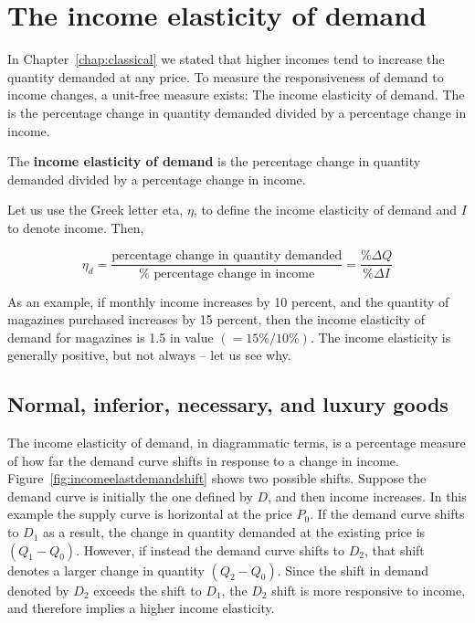 \section{The income elasticity of demand}\label{sec:ch4sec5}

In Chapter~\ref{chap:classical} we stated that higher incomes tend to
increase the quantity demanded at any price. To measure the responsiveness
of demand to income changes, a unit-free measure exists: The income
elasticity of demand. The  is the
percentage change in quantity demanded divided by a percentage change in
income.

\begin{DefBox}
The \textbf{income elasticity of demand} is the percentage change in quantity demanded divided by a percentage change in income.
\end{DefBox}

Let us use the Greek letter eta, $\eta$, to define the income elasticity of
demand and $I$ to denote income. Then,

\begin{equation*}
\eta_{d}=\frac{\text{percentage change in quantity demanded}}{\text{%
percentage change in income}}=\frac{\%\Delta Q}{\%\Delta I} 
\end{equation*}

As an example, if monthly income increases by 10 percent, and the quantity
of magazines purchased increases by 15 percent, then the income elasticity
of demand for magazines is 1.5 in value $(=15\%/10\%)$. The income
elasticity is generally positive, but not always -- let us see why.

\newhtmlpage

\subsection*{Normal, inferior, necessary, and luxury goods}

The income elasticity of demand, in diagrammatic terms, is a percentage
measure of how far the demand curve shifts in response to a change in
income. Figure~\ref{fig:incomeelastdemandshift} shows two possible shifts.
Suppose the demand curve is initially the one defined by $D$, and then
income increases. In this example the supply curve is horizontal at the
price $P_0$. If the demand curve shifts to $D_1$ as a result, the
change in quantity demanded at the existing price is $(Q_1-Q_0)$. However,
if instead the demand curve shifts to $D_2$, that shift denotes a larger
change in quantity $(Q_2-Q_0)$. Since the shift in demand denoted by $D_2$
exceeds the shift to $D_1$, the $D_2$ shift is more responsive to income,
and therefore implies a higher income elasticity.

